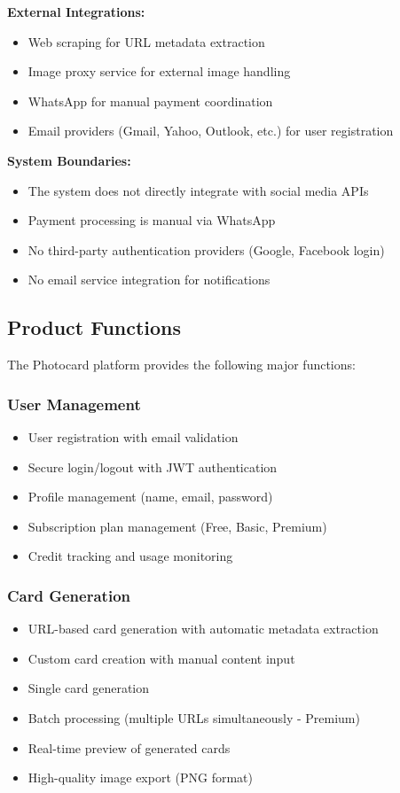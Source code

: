 \documentclass[12pt,a4paper]{article}
\begin{document}
\textbf{External Integrations:}
\begin{itemize}
    \item Web scraping for URL metadata extraction
    \item Image proxy service for external image handling
    \item WhatsApp for manual payment coordination
    \item Email providers (Gmail, Yahoo, Outlook, etc.) for user registration
\end{itemize}

\textbf{System Boundaries:}
\begin{itemize}
    \item The system does not directly integrate with social media APIs
    \item Payment processing is manual via WhatsApp
    \item No third-party authentication providers (Google, Facebook login)
    \item No email service integration for notifications
\end{itemize}

\subsection{Product Functions}

The Photocard platform provides the following major functions:

\subsubsection{User Management}
\begin{itemize}
    \item User registration with email validation
    \item Secure login/logout with JWT authentication
    \item Profile management (name, email, password)
    \item Subscription plan management (Free, Basic, Premium)
    \item Credit tracking and usage monitoring
\end{itemize}

\subsubsection{Card Generation}
\begin{itemize}
    \item URL-based card generation with automatic metadata extraction
    \item Custom card creation with manual content input
    \item Single card generation
    \item Batch processing (multiple URLs simultaneously - Premium)
    \item Real-time preview of generated cards
    \item High-quality image export (PNG format)
\end{itemize}
\end{document}
